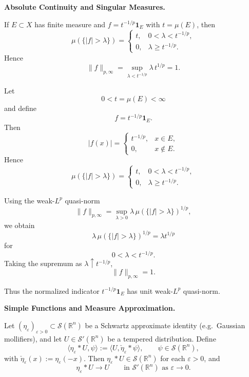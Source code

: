 \begin{problem}[CP-II-0204]
\label{prob:cp-ii-0204}
\textbf{Absolute Continuity and Singular Measures.}

\hspace*{1.5em}If $E\subset X$ has finite measure and
	$f=t^{-1/p}\mathbf{1}_E$ with $t=\mu(E)$, then
	\[
	\mu(\{|f|>\lambda\})=
	\begin{cases}
		t, & 0<\lambda<t^{-1/p},\\[4pt]
		0, & \lambda\ge t^{-1/p}.
	\end{cases}
	\]
	Hence
	\[
	\|f\|_{p,\infty}
	=\sup_{\lambda<t^{-1/p}} \lambda\, t^{1/p}=1.
	\]
\end{problem}

\begin{solution}
Let
\[
0<t=\mu(E)<\infty
\]
and define
\[
f=t^{-1/p}\mathbf1_E.
\]
Then
\[
|f(x)|
=
\begin{cases}
t^{-1/p},&x\in E,\\
0,&x\notin E.
\end{cases}
\]
Hence
\[
\mu(\{|f|>\lambda\})
=
\begin{cases}
t,&0<\lambda<t^{-1/p},\\
0,&\lambda\ge t^{-1/p}.
\end{cases}
\]

Using the weak-\(L^p\) quasi-norm
\[
\|f\|_{p,\infty}
=
\sup_{\lambda>0}
\lambda\,
\mu(\{|f|>\lambda\})^{1/p},
\]
we obtain
\[
\lambda\,
\mu(\{|f|>\lambda\})^{1/p}
=
\lambda t^{1/p}
\]
for
\[
0<\lambda<t^{-1/p}.
\]
Taking the supremum as \(\lambda\uparrow t^{-1/p}\),
\[
\boxed{
\|f\|_{p,\infty}=1.
}
\]

Thus the normalized indicator \(t^{-1/p}\mathbf1_E\) has unit weak-\(L^p\) quasi-norm.
\end{solution}


\begin{problem}[CP-II-0205]
\label{prob:cp-ii-0205}
\textbf{Simple Functions and Measure Approximation.}

\begin{lemma}
	Let $(\eta_\varepsilon)_{\varepsilon>0}\subset\mathcal{S}(\mathbb{R}^n)$
	be a Schwartz approximate identity (e.g.\ Gaussian mollifiers), and let
	$U\in\mathcal{S}'(\mathbb{R}^n)$ be a tempered distribution. Define
	\[
	\langle \eta_\varepsilon * U, \psi\rangle
	:= \big\langle U, \check{\eta}_\varepsilon * \psi \big\rangle,
	\qquad \psi\in\mathcal{S}(\mathbb{R}^n),
	\]
	with $\check{\eta}_\varepsilon(x):=\eta_\varepsilon(-x)$. Then
	$\eta_\varepsilon * U\in\mathcal{S}(\mathbb{R}^n)$ for each
	$\varepsilon>0$, and
	\[
	\eta_\varepsilon * U \longrightarrow U
	\qquad\text{in }\mathcal{S}'(\mathbb{R}^n)\text{ as }\varepsilon\to0.
	\]
\end{lemma}
\end{problem}

